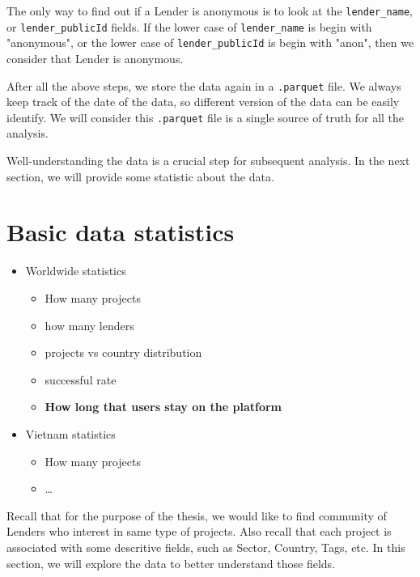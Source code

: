 
The only way to find out if a Lender is anonymous is to look at the \lstinline|lender_name|,
or \lstinline|lender_publicId| fields.
If the lower case of \lstinline|lender_name| is begin with "anonymous",
or the lower case of \lstinline|lender_publicId| is begin with "anon",
then we consider that Lender is anonymous.


After all the above steps, we store the data again in a \lstinline|.parquet| file.
We always keep track of the date of the data, so different version of the data can be easily identify.
We will consider this \lstinline|.parquet| file is a single source of truth for all the analysis.

Well-understanding the data is a crucial step for subsequent analysis.
In the next section, we will provide some statistic about the data.

\section{Basic data statistics}

\begin{itemize}
	\item Worldwide statistics
	      \begin{itemize}
		      \item How many projects
		      \item how many lenders
		      \item projects vs country distribution
		      \item successful rate
		      \item \textbf{How long that users stay on the platform}
	      \end{itemize}
	\item Vietnam statistics
	      \begin{itemize}
		      \item How many projects
		      \item \dots
	      \end{itemize}
\end{itemize}

Recall that for the purpose of the thesis, we would like to find community of Lenders who interest in same type of projects.
Also recall that each project is associated with some descritive fields, such as Sector, Country, Tags, etc.
In this section, we will explore the data to better understand those fields.

